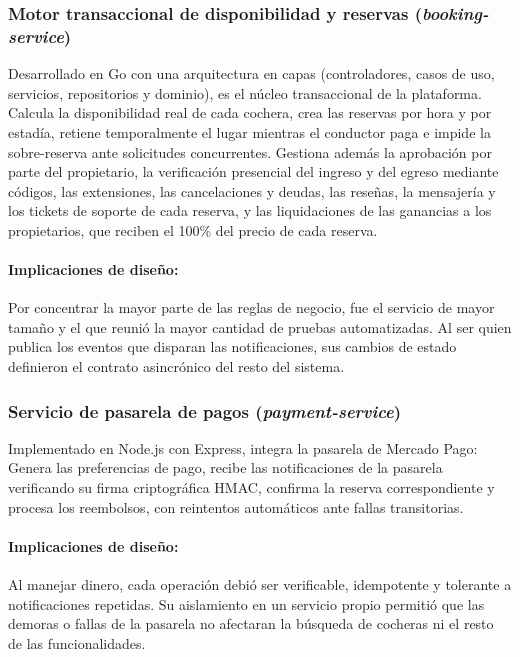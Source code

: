 \subsubsection{Motor transaccional de disponibilidad y reservas (\textit{booking-service})}

Desarrollado en Go con una arquitectura en capas (controladores, casos de uso, servicios, repositorios y dominio), es el núcleo transaccional de la plataforma. Calcula la disponibilidad real de cada cochera, crea las reservas por hora y por estadía, retiene temporalmente el lugar mientras el conductor paga e impide la sobre-reserva ante solicitudes concurrentes. Gestiona además la aprobación por parte del propietario, la verificación presencial del ingreso y del egreso mediante códigos, las extensiones, las cancelaciones y deudas, las reseñas, la mensajería y los tickets de soporte de cada reserva, y las liquidaciones de las ganancias a los propietarios, que reciben el 100\% del precio de cada reserva.

\paragraph{Implicaciones de diseño:} Por concentrar la mayor parte de las reglas de negocio, fue el servicio de mayor tamaño y el que reunió la mayor cantidad de pruebas automatizadas. Al ser quien publica los eventos que disparan las notificaciones, sus cambios de estado definieron el contrato asincrónico del resto del sistema.

\subsubsection{Servicio de pasarela de pagos (\textit{payment-service})}

Implementado en Node.js con Express, integra la pasarela de Mercado Pago: Genera las preferencias de pago, recibe las notificaciones de la pasarela verificando su firma criptográfica HMAC, confirma la reserva correspondiente y procesa los reembolsos, con reintentos automáticos ante fallas transitorias.

\paragraph{Implicaciones de diseño:} Al manejar dinero, cada operación debió ser verificable, idempotente y tolerante a notificaciones repetidas. Su aislamiento en un servicio propio permitió que las demoras o fallas de la pasarela no afectaran la búsqueda de cocheras ni el resto de las funcionalidades.

